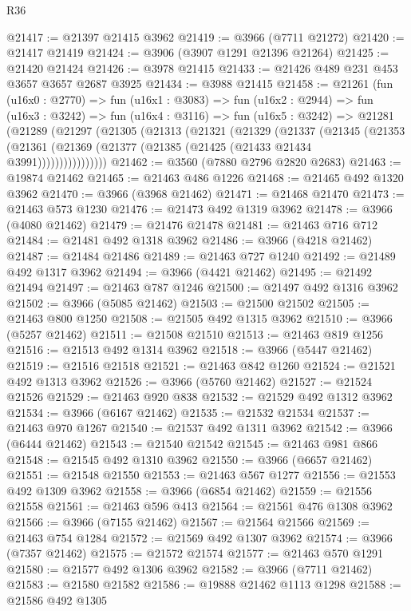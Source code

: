 \begin{lexlean}{R36}
\begin{coremodule}
@21417 := @21397 @21415 @3962
@21419 := @3966 (@7711 @21272)
@21420 := @21417 @21419
@21424 := @3906 (@3907 @1291 @21396 @21264)
@21425 := @21420 @21424
@21426 := @3978 @21415
@21433 := @21426 @489 @231 @453 @3657 @3657 @2687 @3925
@21434 := @3988 @21415
@21458 := @21261
    (fun (u16x0 : @2770) =>
    fun (u16x1 : @3083) =>
    fun (u16x2 : @2944) =>
    fun (u16x3 : @3242) =>
    fun (u16x4 : @3116) =>
    fun (u16x5 : @3242) =>
    @21281
      (@21289
        (@21297
          (@21305
            (@21313
              (@21321
                (@21329
                  (@21337
                    (@21345
                      (@21353
                        (@21361 (@21369 (@21377 (@21385 (@21425 (@21433 @21434 @3991))))))))))))))))
@21462 := @3560 (@7880 @2796 @2820 @2683)
@21463 := @19874 @21462
@21465 := @21463 @486 @1226
@21468 := @21465 @492 @1320 @3962
@21470 := @3966 (@3968 @21462)
@21471 := @21468 @21470
@21473 := @21463 @573 @1230
@21476 := @21473 @492 @1319 @3962
@21478 := @3966 (@4080 @21462)
@21479 := @21476 @21478
@21481 := @21463 @716 @712
@21484 := @21481 @492 @1318 @3962
@21486 := @3966 (@4218 @21462)
@21487 := @21484 @21486
@21489 := @21463 @727 @1240
@21492 := @21489 @492 @1317 @3962
@21494 := @3966 (@4421 @21462)
@21495 := @21492 @21494
@21497 := @21463 @787 @1246
@21500 := @21497 @492 @1316 @3962
@21502 := @3966 (@5085 @21462)
@21503 := @21500 @21502
@21505 := @21463 @800 @1250
@21508 := @21505 @492 @1315 @3962
@21510 := @3966 (@5257 @21462)
@21511 := @21508 @21510
@21513 := @21463 @819 @1256
@21516 := @21513 @492 @1314 @3962
@21518 := @3966 (@5447 @21462)
@21519 := @21516 @21518
@21521 := @21463 @842 @1260
@21524 := @21521 @492 @1313 @3962
@21526 := @3966 (@5760 @21462)
@21527 := @21524 @21526
@21529 := @21463 @920 @838
@21532 := @21529 @492 @1312 @3962
@21534 := @3966 (@6167 @21462)
@21535 := @21532 @21534
@21537 := @21463 @970 @1267
@21540 := @21537 @492 @1311 @3962
@21542 := @3966 (@6444 @21462)
@21543 := @21540 @21542
@21545 := @21463 @981 @866
@21548 := @21545 @492 @1310 @3962
@21550 := @3966 (@6657 @21462)
@21551 := @21548 @21550
@21553 := @21463 @567 @1277
@21556 := @21553 @492 @1309 @3962
@21558 := @3966 (@6854 @21462)
@21559 := @21556 @21558
@21561 := @21463 @596 @413
@21564 := @21561 @476 @1308 @3962
@21566 := @3966 (@7155 @21462)
@21567 := @21564 @21566
@21569 := @21463 @754 @1284
@21572 := @21569 @492 @1307 @3962
@21574 := @3966 (@7357 @21462)
@21575 := @21572 @21574
@21577 := @21463 @570 @1291
@21580 := @21577 @492 @1306 @3962
@21582 := @3966 (@7711 @21462)
@21583 := @21580 @21582
@21586 := @19888 @21462 @1113 @1298
@21588 := @21586 @492 @1305

\end{coremodule}
\end{lexlean}
